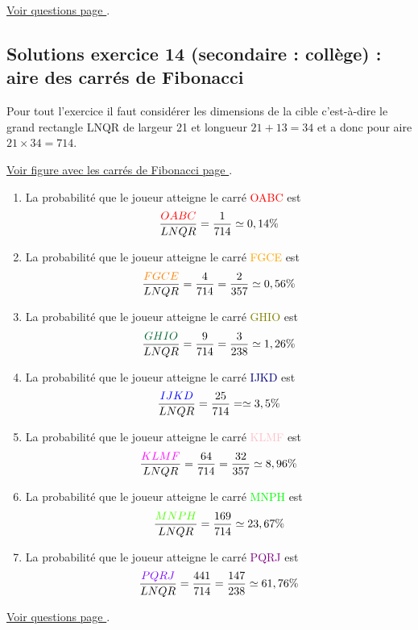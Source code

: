 \hyperref[geom:niveau13]{Voir questions page \pageref{geom:niveau13}}.


\newpage


\subsection{Solutions exercice 14 (secondaire : collège) : aire des carrés de Fibonacci}

\label{sol:niveau14}

Pour tout l'exercice il faut considérer les dimensions de la cible c'est-à-dire le grand rectangle LNQR de largeur 21 et longueur $21 + 13 = 34$ et a donc pour aire $21\times 34 = 714$.

\hyperref[fig:fibo-squares]{Voir figure avec les carrés de Fibonacci page \pageref{fig:fibo-squares}}.

\begin{enumerate}[label=G\arabic*)]
	\item La probabilité que le joueur atteigne le carré \textcolor{red}{OABC} est 
	\[\dfrac{\textcolor{red}{OABC}}{LNQR} = \dfrac{1}{714} \simeq 0,14\%\]
	\item La probabilité que le joueur atteigne le carré \textcolor{orange}{FGCE} est 
	\[\dfrac{\textcolor{orange}{FGCE}}{LNQR} = \dfrac{4}{714} = \dfrac{2}{357} \simeq 0,56\%\] 
	\item La probabilité que le joueur atteigne le carré \textcolor{olive}{GHIO} est 
	\[\dfrac{\textcolor{olive}{GHIO}}{LNQR} = \dfrac{9}{714} = \dfrac{3}{238} \simeq 1,26\%\]
	\item La probabilité que le joueur atteigne le carré \textcolor{navy}{IJKD} est 
	\[\dfrac{\textcolor{navy}{IJKD}}{LNQR} = \dfrac{25}{714} =  \simeq 3,5\%\]
	\item La probabilité que le joueur atteigne le carré \textcolor{pink}{KLMF} est 
	\[\dfrac{\textcolor{pink}{KLMF}}{LNQR} = \dfrac{64}{714} = \dfrac{32}{357} \simeq 8,96\%\]
	\item La probabilité que le joueur atteigne le carré \textcolor{lime}{MNPH} est 
	\[\dfrac{\textcolor{lime}{MNPH}}{LNQR} = \dfrac{169}{714} \simeq 23,67\%\]
	\item La probabilité que le joueur atteigne le carré \textcolor{purple}{PQRJ} est 
	\[\dfrac{\textcolor{purple}{PQRJ}}{LNQR} = \dfrac{441}{714} = \dfrac{147}{238} \simeq 61,76\%\]    
\end{enumerate}


\hyperref[proba:niveau14]{Voir questions page \pageref{proba:niveau14}}.


\newpage

